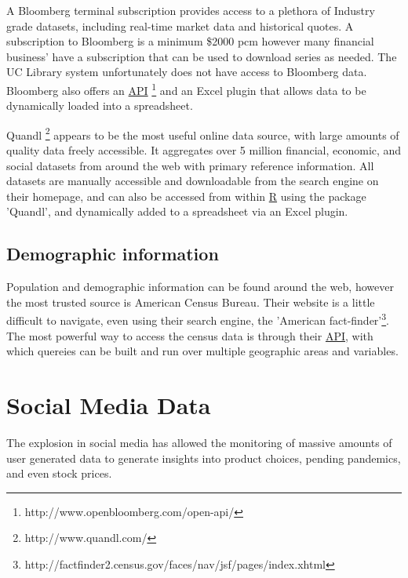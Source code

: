 \documentclass[11pt]{article}
\begin{document}
	A Bloomberg terminal subscription provides access to a plethora of Industry grade datasets, including real-time market data and historical quotes.
	A subscription to Bloomberg is a minimum \$2000 pcm however many financial business' have a subscription that can be used to download series as needed.
	The UC Library system unfortunately does not have access to Bloomberg data.
	Bloomberg also offers an \hyperref[api]{API} \footnote{http://www.openbloomberg.com/open-api/} and an Excel plugin that allows data to be dynamically loaded into a spreadsheet.

	Quandl \footnote{http://www.quandl.com/} appears to be the most useful online data source, with large amounts of quality data freely accessible.
	It aggregates over 5 million financial, economic, and social datasets from around the web with primary reference information.
	All datasets are manually accessible and downloadable from the search engine on their homepage, and can also be accessed from within \hyperref[R]{R} using the package 'Quandl', and dynamically added to a spreadsheet via an Excel plugin. 

	
	\subsection{Demographic information}

	Population and demographic information can be found around the web, however the most trusted source is American Census Bureau. 
	Their website is a little difficult to navigate, even using their search engine, the 'American fact-finder'\footnote{http://factfinder2.census.gov/faces/nav/jsf/pages/index.xhtml}.
	The most powerful way to access the census data is through their \hyperref[api]{API}, with which quereies can be built and run over multiple geographic areas and variables.


	\section{Social Media Data}
	The explosion in social media has allowed the monitoring of massive amounts of user generated data to generate insights into product choices, pending pandemics, and even stock prices.
\end{document}
